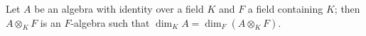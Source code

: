 Let $A$ be an algebra with identity over a field $K$ and $F$ a field containing $K$; then $A \otimes_K F$ is an $F$-algebra such that $\dim_K A = \dim_F(A \otimes_K F)$.
